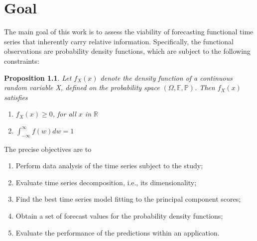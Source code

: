 \documentclass[
	12pt,				%
	oneside,			%
	a4paper,			%
	english,			%
	brazil				%
	]{abntex2ppgsi}
\newtheorem{proposition}{Proposition}
\begin{document}






\chapter{Goal}
The main goal of this work is to assess the viability of forecasting functional time series that inherently carry relative information. Specifically, the functional observations are probability density functions, which are subject to the following constraints:
\begin{proposition}
Let $f_X(x)$ denote the density function of a continuous random variable X,  defined on the probability space $(\Omega, \mathbb{F}, \mathbb{P})$. Then $f_X(x)$ satisfies
\begin{enumerate}
    \item $f_X(x)\geq0$, for all $x$ in $\mathbb{R}$
    \item $\int_{-\infty}^{\infty}f(w)dw=1$
\end{enumerate}
    
\end{proposition}

The precise objectives are to
\begin{enumerate}
    \item Perform data analysis of the time series subject to the study;
    \item Evaluate time series decomposition, i.e., its dimensionality;
    \item Find the best time series model fitting to the principal component scores;
    \item Obtain a set of forecast values for the probability density functions;
    \item Evaluate the performance of the predictions within an application.
\end{enumerate}
\end{document}
